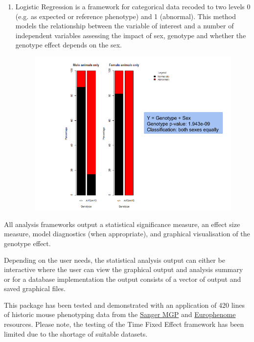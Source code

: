\documentclass[12pt,a4paper]{article}
\begin{document}
\begin{enumerate}
\item Logistic Regression is a framework for categorical data recoded to two levels 0 (e.g. as expected or reference phenotype) and 1 (abnormal). This method models the relationship between the variable of interest and a number of independent variables assessing the impact of sex, genotype and whether the genotype effect depends on the sex.
\begin{figure}[H]%
\centerline{\includegraphics[scale=0.5]{LR_simple.png}}
\end{figure}

\end{enumerate}

All analysis frameworks output a statistical significance measure, an effect size measure, model diagnostics (when appropriate), and graphical visualisation of the genotype effect. 

Depending on the user needs, the statistical analysis output can either be interactive where the user can view the graphical output and analysis summary or for a database implementation the output consists of a vector of output and saved graphical files. 

This package has been tested and demonstrated with an application of 420 lines of historic mouse phenotyping data from the  \href{http://www.sanger.ac.uk/mouseportal/}{Sanger MGP} and \href{http://www.europhenome.org/}{Europhenome} resources. Please note, the testing of the Time Fixed Effect framework has been limited due to the shortage of suitable datasets.
\\
\end{document}
